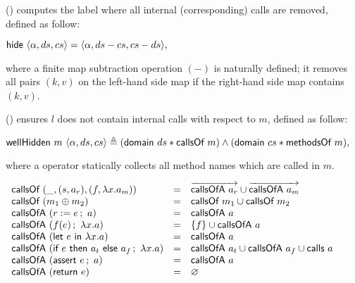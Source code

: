 () computes the label where all internal (corresponding) calls
are removed, defined as follow:

\begin{definition}
  \label{def-hide}
  \mbox{}
  \begin{center}
    \begin{math}
      \hide{\semlbl{\alpha}{ds}{cs}} = \semlbl{\alpha}{ds - cs}{cs - ds},
    \end{math}
  \end{center}
\end{definition}
where a finite map subtraction operation $(-)$ is naturally defined; it
removes all pairs $(k, v)$ on the left-hand side map if the right-hand
side map contains $(k, v)$.

() ensures $l$ does not contain internal calls with
respect to $m$, defined as follow:

\begin{definition}
  \label{def-wellhidden}
  \mbox{}
  \begin{center}
    \begin{math}
      \wellhidden{m}{\semlbl{\alpha}{ds}{cs}} \triangleq (\keysdisj{ds}{\callsofm{m}}) \wedge (\keysdisj{cs}{\methsofm{m}}),
    \end{math}
  \end{center}
\end{definition}
where a  operator statically collects all method names
which are called in $m$.

\begin{definition}
  \label{def-callsof}
  \mbox{}
  \begin{center}
    \begin{math}
      \begin{array}{lcl}
        \callsofm{(\_, \rulepair{s}{a_r}, \methodpair{f}{\lambda x.a_m})}
        & = & \listof{\callsofa{a_r}} \cup \listof{\callsofa{a_m}} \\
        \callsofm{(\modcomp{m_1}{m_2})} & = & \callsofm{m_1} \cup \callsofm{m_2} \\
        \callsofa{(\actwrite{r}{e}{a})} & = & \callsofa{a} \\
        \callsofa{(\actcall{x}{f}{e}{a})} & = & \{ f \} \cup \callsofa{a} \\
        \callsofa{(\actlet{e}{x}{a})} & = & \callsofa{a} \\
        \callsofa{(\actifelse{e}{a_t}{a_f}{x}{a})} & = & \callsofa{a_t} \cup \callsofa{a_f} \cup \callsof{a} \\
        \callsofa{(\actassert{e}{a})} & = & \callsofa{a} \\
        \callsofa{(\actret{e})} & = & \emptyset \\
      \end{array}
    \end{math}
  \end{center}
\end{definition}

